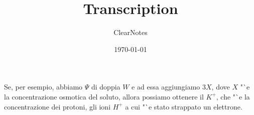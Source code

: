 \documentclass[11pt, a4paper]{article}
\title{Transcription}
\author{ClearNotes}
\date{\today}
\begin{document}
\maketitle
\begin{spacing}{1.15}
Se, per esempio, abbiamo $\Psi$ di doppia $W$ e ad essa aggiungiamo $3X$, dove $X$ "`e la concentrazione osmotica del soluto, allora possiamo ottenere il $K^+$, che "`e la concentrazione dei protoni, gli ioni $H^+$ a cui "`e stato strappato un elettrone.
\end{spacing}
\end{document}
